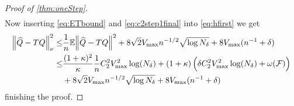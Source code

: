 \begin{proof}[Proof of \cref{thm:oneStep}]
\begin{align}
    \label{eq:ETbound}
  \end{align}
  Now inserting \cref{eq:ETbound} and \cref{eq:c2step1final} into \cref{eq:hfirst}
  we get
  \begin{align}
    \norm{\widehat{Q} - TQ}^2_\nu \leq & \frac{1}{n} \mathbb{E} \norm{\widehat{Q} - TQ}^2
    + 8 \sqrt{2} V_{\max} n^{-1/2} \sqrt{\log N_\delta}
    + 8 V_{\max} (n^{-1} + \delta)
    \\ \leq & \frac{(1+\kappa)^2}{\kappa} \frac{1}{n}
    C_2^2 V_{\max}^2 \log(N_\delta)
    + (1 + \kappa) \left( \delta C_2^2 V_{\max}^2 \log(N_\delta)
    + \omega(\mathcal{F}) \right) 
    \notag
    \\ & + 8 \sqrt{2} V_{\max} n^{-1/2} \sqrt{\log N_\delta}
    + 8 V_{\max} (n^{-1} + \delta)
    \label{eq:C2final}
  \end{align}
  finishing the proof.
\end{proof}




